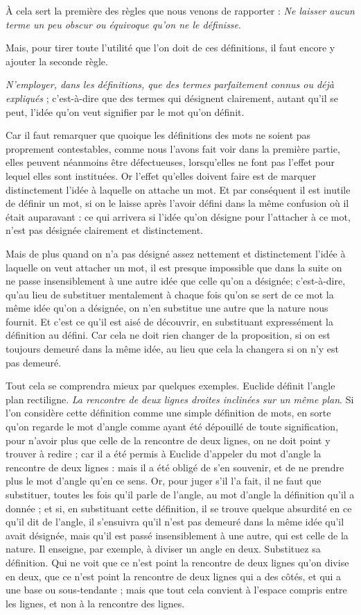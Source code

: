 À cela sert la première des règles que nous venons de rapporter : \emph{Ne laisser aucun terme un peu obscur ou équivoque qu'on ne le définisse}.

Mais, pour tirer toute l'utilité que l'on doit de ces définitions, il faut encore y ajouter la seconde règle.

\emph{N'employer, dans les définitions, que des termes parfaitement connus ou déjà expliqués} ; c'est-à-dire que des termes qui désignent clairement, autant qu'il se peut, l'idée qu'on veut signifier par le mot qu'on définit.

Car il faut remarquer que quoique les définitions des mots ne soient pas proprement contestables, comme nous l'avons fait voir dans la première partie, elles peuvent néanmoins être défectueuses, lorsqu'elles ne font pas l'effet pour lequel elles sont instituées. Or l'effet qu'elles doivent faire est de marquer distinctement l'idée à laquelle on attache un mot. Et par conséquent il est inutile de définir un mot, si on le laisse après l'avoir défini dans la même confusion où il était auparavant : ce qui arrivera si l'idée qu'on désigne pour l'attacher à ce mot, n'est pas désignée clairement et distinctement.

Mais de plus quand on n'a pas désigné assez nettement et distinctement l'idée à laquelle on veut attacher un mot, il est presque impossible que dans la suite on ne passe insensiblement à une autre idée que celle qu'on a désignée; c'est-à-dire, qu'au lieu de substituer mentalement à chaque fois qu'on se sert de ce mot la même idée qu'on a désignée, on n'en substitue une autre que la nature nous fournit. Et c'est ce qu'il est aisé de découvrir, en substituant expressément la définition au défini. Car cela ne doit rien changer de la proposition, si on est toujours demeuré dans la même idée, au lieu que cela la changera si on n'y est pas demeuré.

Tout cela se comprendra mieux par quelques exemples. Euclide définit l'angle plan rectiligne. \emph{La rencontre de deux lignes droites inclinées sur un même plan}. Si l'on considère cette définition comme une simple définition de mots, en sorte qu'on regarde le mot d'angle comme ayant été dépouillé de toute signification, pour n'avoir plus que celle de la rencontre de deux lignes, on ne doit point y trouver à redire ; car il a été permis à Euclide d'appeler du mot d'angle la rencontre de deux lignes : mais il a été obligé de s'en souvenir, et de ne prendre plus le mot d'angle qu'en ce sens. Or, pour juger s'il l'a fait, il ne faut que substituer, toutes les fois qu'il parle de l'angle, au mot d'angle la définition qu'il a donnée ; et si, en substituant cette définition, il se trouve quelque absurdité en ce qu'il dit de l'angle, il s'ensuivra qu'il n'est pas demeuré dans la même idée qu'il avait désignée, mais qu'il est passé insensiblement à une autre, qui est celle de la nature. Il enseigne, par exemple, à diviser un angle en deux. Substituez sa définition. Qui ne voit que ce n'est point la rencontre de deux lignes qu'on divise en deux, que ce n'est point la rencontre de deux lignes qui a des côtés, et qui a une base ou sous-tendante ; mais que tout cela convient à l'espace compris entre les lignes, et non à la rencontre des lignes.

